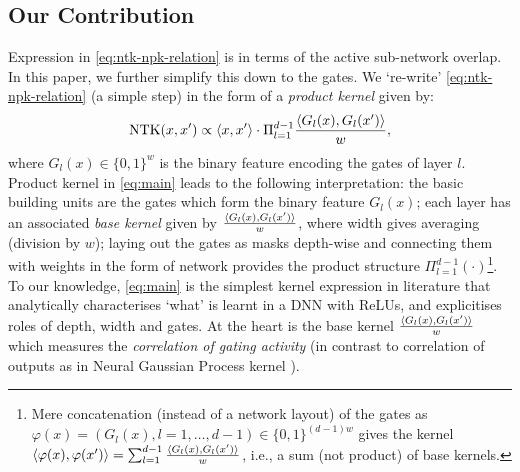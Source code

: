 \subsection{Our Contribution}
Expression in \eqref{eq:ntk-npk-relation} is in terms of the active sub-network overlap. In this paper, we further simplify this down to the gates. We `re-write' \eqref{eq:ntk-npk-relation} (a simple step) in the form of a \emph{product kernel} given by:
\begin{align}\label{eq:main}
\text{NTK}(x,x') \propto \langle x,x'\rangle\cdot \Pi_{l=1}^{d-1} \frac{\langle G_l(x),G_l(x')\rangle}w, 
 \end{align}
where $G_l(x)\in\{0,1\}^w$ is the binary feature encoding the gates of layer $l$. Product kernel in \eqref{eq:main} leads to the following interpretation: the basic building units are the gates which form the binary feature $G_l(x)$; each layer has an associated \emph{base kernel} given by $\frac{\langle G_l(x),G_l(x')\rangle}w$, where width gives averaging (division by $w$); laying out the gates as masks depth-wise and connecting them with weights in the form of network provides the product structure $\Pi_{l=1}^{d-1} (\cdot)$\footnote{Mere concatenation (instead of a network layout) of the gates as $\varphi(x)=(G_l(x),l=1,\ldots,d-1)\in\{0,1\}^{(d-1)w}$ gives the kernel $\langle \varphi(x),\varphi(x')\rangle=\sum_{l=1}^{d-1}\frac{\langle G_l(x),G_l(x')\rangle}w$, i.e., a sum  (not product) of base kernels.}. To our knowledge, \eqref{eq:main} is the simplest kernel expression in literature that analytically characterises `what' is learnt in a DNN with ReLUs, and explicitises roles of depth, width and gates. At the heart is the base kernel  $\frac{\langle G_l(x),G_l(x')\rangle}w$ which measures the \emph{correlation of gating activity} (in contrast to correlation of outputs as in Neural Gaussian Process kernel \cite{convgp,fcgp}).

